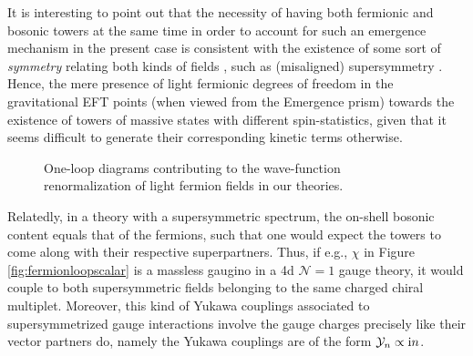 It is interesting to point out that the  necessity of having both fermionic and bosonic towers at the same time in order to account for such an emergence mechanism in the present case is consistent with the existence of some sort of \emph{symmetry} relating both kinds of fields \cite{Palti:2020tsy}, such as (misaligned) supersymmetry \cite{Dienes_1995}. Hence, the mere presence of light fermionic degrees of freedom in the gravitational EFT points (when viewed from the Emergence prism) towards the existence of towers of massive states with different spin-statistics, given that it seems difficult to generate their corresponding kinetic terms otherwise.
%
\begin{figure}[t]
		\begin{center}
			\qquad \qquad 
			\caption{One-loop diagrams contributing to the wave-function renormalization of light fermion fields in our theories.}
			\label{fig:kineticfermionsbas}
		\end{center}
\end{figure} 
%
Relatedly, in a theory with a supersymmetric spectrum, the on-shell bosonic content equals that of the fermions, such that one would expect the towers to come along with their respective superpartners. Thus, if e.g., $\chi$ in Figure \ref{fig:fermionloopscalar} is a massless gaugino in a 4d $\mathcal{N}=1$ gauge theory, it would couple to both supersymmetric fields belonging to the same charged chiral multiplet. Moreover, this kind of Yukawa couplings associated to supersymmetrized gauge interactions involve the gauge charges precisely like their vector partners do\cite{Wess:1992cp}, namely the Yukawa couplings are of the form $\mathcal{Y}_n \propto \text{i} n$. %

